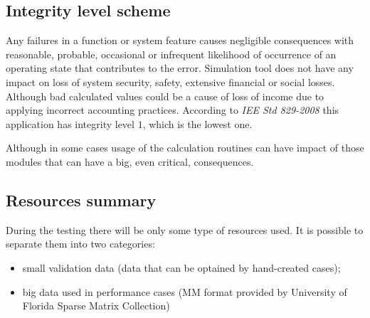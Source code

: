 \subsection{Integrity level scheme} \label{s:introduction:integrity-level-scheme}
	\begin{comment}
		$<$Describe the identified integrity level scheme for the software-based system or software product, and the mapping of the selected scheme to the integrity level scheme used in this standard. If the selected integrity level scheme is the example presented in this standard, it may be referenced and does not need to be repeated in the MTP. The MTP documents the assignment of integrity levels to individual components (e.g., requirements, functions, software modules, subsystems, non-functional characteristics, or other partitions), where there are differing integrity levels assigned within the system. At the beginning of each process, the assignment of integrity levels is reassessed with respect to changes that may need to be made in the integrity levels as a result of architecture selection, design choices, code construction, or other development activities. $>$
	\end{comment}
	Any failures in a function or system feature causes negligible consequences with reasonable, probable, occasional or infrequent likelihood of occurrence of an operating state that contributes to the error. Simulation tool does not have any impact on loss of system security, safety, extensive financial or social losses. Although bad calculated values could be a cause of loss of income due to applying incorrect accounting practices. According to \emph{IEE Std 829-2008} this application has integrity level $1$, which is the lowest one.
	
	Although in some cases usage of the calculation routines can have impact of those modules that can have a big, even critical, consequences.
\subsection{Resources summary} \label{s:introduction:resources-summary}
	\begin{comment}
		$<$Summarize the test resources, including staffing, facilities, tools, and special procedural requirements (e.g., security, access rights, and documentation control). $>$
	\end{comment}
	During the testing there will be only some type of resources used. It is possible to separate them into two categories:
	\begin{itemize}
		\item small validation data (data that can be optained by hand-created cases);
		\item big data used in performance cases (\gls{MM} format provided by University of Florida Sparse Matrix Collection)
	\end{itemize}
